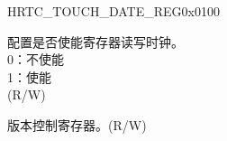\begin{register}{H}{RTC\_TOUCH\_DATE\_REG}{0x0100}\label{regdesc:RTCTOUCHDATEREG}
%
%
%
\regnewline%
\begin{regdesc}\begin{reglist}
\label{fielddesc:RTCCLKEN}\item [RTC\_CLK\_EN] 配置是否使能寄存器读写时钟。\\
0：不使能\\
1：使能\\
(R/W)
\label{fielddesc:RTCDATE}\item [RTC\_DATE] 版本控制寄存器。(R/W)
\end{reglist}\end{regdesc}
\end{register}
